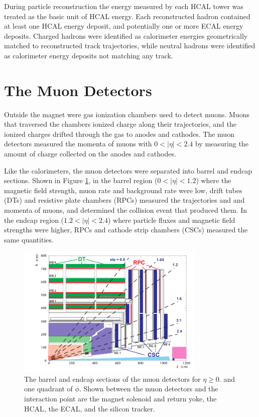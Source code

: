 During particle reconstruction the energy measured by each HCAL tower was treated as the basic unit of HCAL energy.  
Each reconstructed hadron contained at least one HCAL energy deposit, and potentially one or more ECAL energy 
deposits.  Charged hadrons were identified as calorimeter energies geometrically matched to reconstructed 
track trajectories, while neutral hadrons were identified as calorimeter energy deposits not matching any 
track.


\section{The Muon Detectors}
\label{sec:muonDetectorsDescription}
Outside the magnet were gas ionization chambers used to detect muons.  Muons that traversed the chambers 
ionized charge along their trajectories, and the ionized charges drifted through the gas to anodes and 
cathodes.  The muon detectors measured the momenta of muons with $0 < |\eta| < 2.4$ by measuring the amount of 
charge collected on the anodes and cathodes.

Like the calorimeters, the muon detectors were separated into barrel and endcap sections.  Shown in Figure \ref{fig:muonBarrelAndEndcapDetectors}, in the barrel 
region ($0 < |\eta| < 1.2$) where the magnetic field strength, muon rate and background rate were low, drift 
tubes (DTs) and resistive plate chambers (RPCs) measured the trajectories and 
and momenta of muons, and determined the collision event that produced them.  In the endcap 
region ($1.2 < |\eta| < 2.4$) where particle fluxes and magnetic field strengths were higher, RPCs and cathode 
strip chambers (CSCs) measured the same quantities.

\begin{figure}[ht]
	\centering
	\includegraphics[width=0.8\textwidth]{figures/muonDetectorLayout.png}
	\caption{The barrel and endcap sections of the muon detectors for $\eta \geq 0.$ and one quadrant of $\phi$.  Shown 
		between the muon detectors and the interaction point are the magnet solenoid and return yoke, the HCAL, the ECAL, 
		and the silicon tracker.}
	\label{fig:muonBarrelAndEndcapDetectors}
\end{figure}


